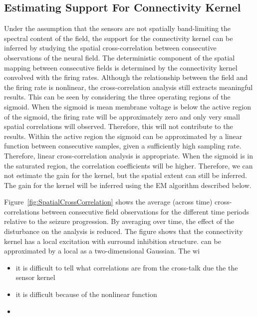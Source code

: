 \documentclass[]{article}
\begin{document}
\subsection{Estimating Support For Connectivity Kernel}
Under the assumption that the sensors are not spatially band-limiting the spectral content of the field, the support for the connectivity kernel can be inferred by studying the spatial cross-correlation between consecutive observations of the neural field. The deterministic component of the spatial mapping between consecutive fields is determined by the connectivity kernel convolved with the firing rates. Although the relationship between the field and the firing rate is nonlinear, the cross-correlation analysis still extracts meaningful results. This can be seen by considering the three operating regions of the sigmoid. When the sigmoid is mean membrane voltage is below the active region of the sigmoid, the firing rate will be approximately zero and only very small spatial correlations will observed. Therefore, this will not contribute to the results. Within the active region the sigmoid can be approximated by a linear function between consecutive samples, given a sufficiently high sampling rate. Therefore, linear cross-correlation analysis is appropriate. When the sigmoid is in the saturated region, the correlation coefficients will be higher. Therefore, we can not estimate the gain for the kernel, but the spatial extent can still be inferred. The gain for the kernel will be inferred using the EM algorithm described below.

Figure~\ref{fig:SpatialCrossCorrelation} shows the average (across time) cross-correlations between consecutive field observations for the different time periods relative to the seizure progression. By averaging over time, the effect of the disturbance on the analysis is reduced. The figure shows that the connectivity kernel has a local excitation with surround inhibition structure. can be approximated by a local as a two-dimensional Gaussian. The wi
\begin{itemize}
	\item it is difficult to tell what correlations are from the cross-talk due the the sensor kernel
	\item it is difficult because of the nonlinear function
	\item 
\end{itemize}
\end{document}
